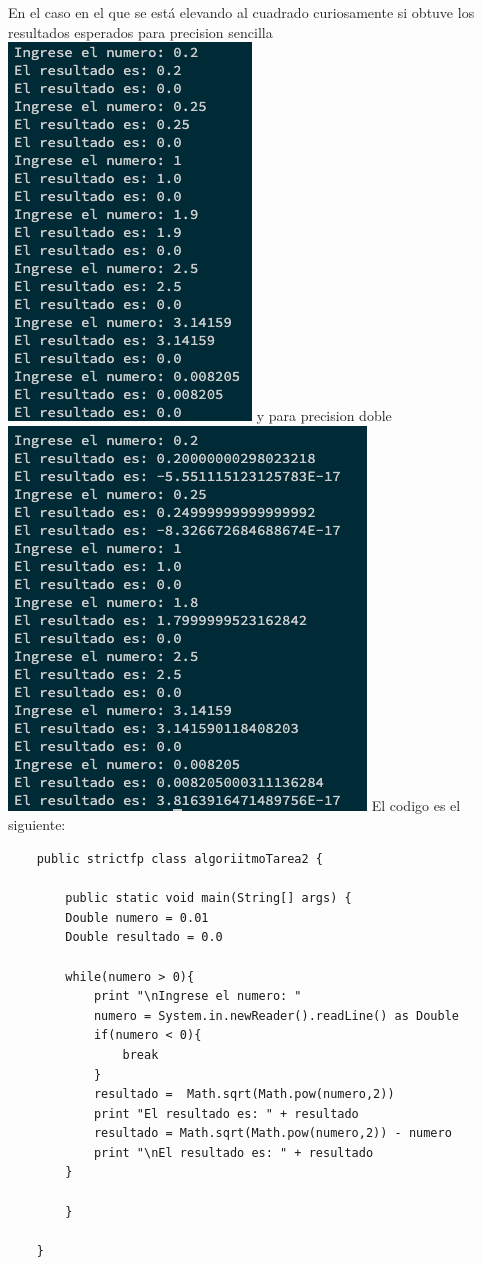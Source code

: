 \documentclass{article}
\begin{document}
En el caso en el que se está elevando al cuadrado curiosamente si obtuve los resultados esperados para precision sencilla
\linebreak
\includegraphics[scale=0.75]{resultadoAlgoritmoCuadradoSencilla.png}
\linebreak
y para precision doble
\linebreak
\includegraphics[scale=0.75]{resultadoAlgoritmoPrecisionDoble.png}
\linebreak
El codigo es el siguiente:
\begin{lstlisting}
    public strictfp class algoriitmoTarea2 {

        public static void main(String[] args) {
        Double numero = 0.01
        Double resultado = 0.0
        
        while(numero > 0){
            print "\nIngrese el numero: "
            numero = System.in.newReader().readLine() as Double
            if(numero < 0){
                break
            }
            resultado =  Math.sqrt(Math.pow(numero,2))
            print "El resultado es: " + resultado
            resultado = Math.sqrt(Math.pow(numero,2)) - numero
            print "\nEl resultado es: " + resultado
        }
        
        }    
            
    }
\end{lstlisting}
\end{document}
